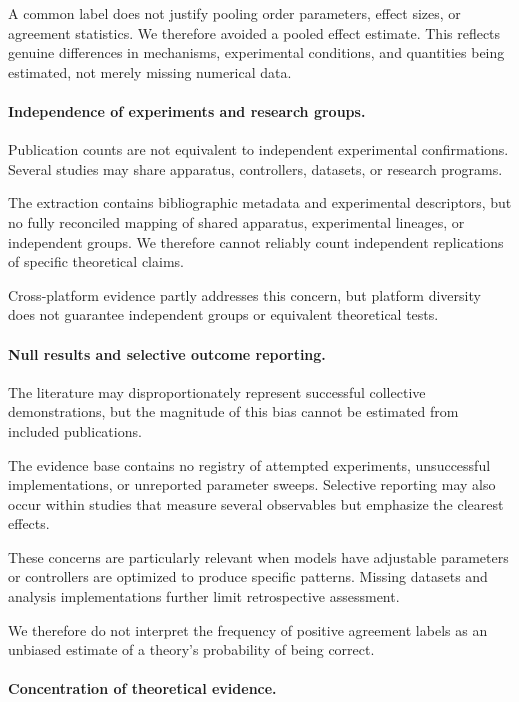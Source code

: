 A common label does not justify pooling
order parameters, effect sizes, or
agreement statistics. We therefore
avoided a pooled effect estimate.
This reflects genuine differences
in mechanisms, experimental conditions,
and quantities being estimated,
not merely missing numerical data.

\paragraph*{Independence of experiments and research groups.}

Publication counts are not equivalent to
independent experimental confirmations.
Several studies may share apparatus,
controllers, datasets, or research programs.

The extraction contains bibliographic metadata
and experimental descriptors, but no fully
reconciled mapping of shared apparatus,
experimental lineages, or independent groups.
We therefore cannot reliably count
independent replications of specific
theoretical claims.

Cross-platform evidence partly addresses
this concern, but platform diversity
does not guarantee independent groups
or equivalent theoretical tests.

\paragraph*{Null results and selective outcome reporting.}

The literature may disproportionately represent
successful collective demonstrations, but
the magnitude of this bias cannot be
estimated from included publications.

The evidence base contains no registry
of attempted experiments, unsuccessful
implementations, or unreported parameter
sweeps. Selective reporting may also
occur within studies that measure several
observables but emphasize the clearest effects.

These concerns are particularly relevant
when models have adjustable parameters
or controllers are optimized to produce
specific patterns. Missing datasets
and analysis implementations further
limit retrospective assessment.

We therefore do not interpret the
frequency of positive agreement labels
as an unbiased estimate of a
theory's probability of being correct.

\paragraph*{Concentration of theoretical evidence.}

